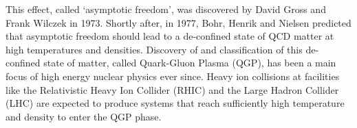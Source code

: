 This effect, called `asymptotic freedom', was discovered by David Gross and Frank Wilczek in 1973\cite{gross_ultraviolet_1973}. Shortly after, in 1977, Bohr, Henrik and Nielsen predicted that asymptotic freedom should lead to a de-confined state of QCD matter at high temperatures and densities\cite{bohr_hadron_1977}. Discovery of and classification of this de-confined state of matter, called Quark-Gluon Plasma (QGP), has been a main focus of high energy nuclear physics ever since. Heavy ion collisions at facilities like the Relativistic Heavy Ion Collider (RHIC) and the Large Hadron Collider (LHC) are expected to produce systems that reach sufficiently high temperature and density to enter the QGP phase\cite{bohr_hadron_1977}.


